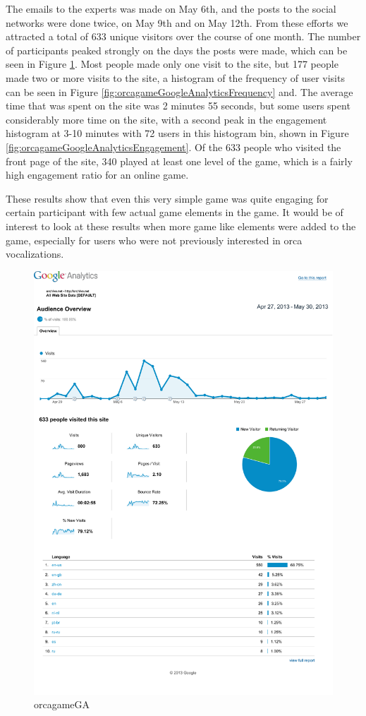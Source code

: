 \documentclass[12pt,oneside]{book}
\begin{document}
The emails to the experts was made on May 6th, and the posts to the
social networks were done twice, on May 9th and on May 12th.  From
these efforts we attracted a total of 633 unique visitors over the
course of one month.  The number of participants peaked strongly on
the days the posts were made, which can be seen in Figure
\ref{fig:orcagameGA}.  Most people made only one visit to the site,
but 177 people made two or more visits to the site, a histogram of the
frequency of user visits can be seen in Figure
\ref{fig:orcagameGoogleAnalyticsFrequency} and.  The average time that
was spent on the site was 2 minutes 55 seconds, but some users spent
considerably more time on the site, with a second peak in the
engagement histogram at 3-10 minutes with 72 users in this histogram
bin, shown in Figure \ref{fig:orcagameGoogleAnalyticsEngagement}.  Of
the 633 people who visited the front page of the site, 340 played at
least one level of the game, which is a fairly high engagement ratio
for an online game.

These results show that even this very simple game was quite engaging
for certain participant with few actual game elements in the game.  It
would be of interest to look at these results when more game like
elements were added to the game, especially for users who were not
previously interested in orca vocalizations.


\begin{figure}[h]
\centering
\includegraphics[width=\columnwidth]{figures/orcagameGA}
\caption{orcagameGA}
\label{fig:orcagameGA}
\end{figure}
\end{document}
